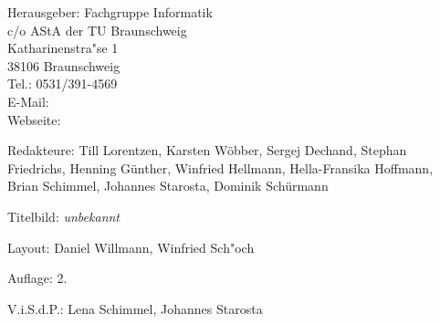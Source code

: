 
\begin{nimpressum}
\item[Herausgeber:]
	Fachgruppe Informatik\\
	c/o AStA der TU Braunschweig\\
	Katharinenstra"se 1\\
	38106 Braunschweig\\
	Tel.: 0531/391-4569\\
	E-Mail: \\
	Webseite: 
      \item[Redakteure:]
	Till Lorentzen,
	Karsten Wöbber, %
        Sergej Dechand,
        Stephan Friedrichs,
        Henning Günther,
        Winfried Hellmann,
        Hella-Fransika Hoffmann,
        Brian Schimmel,
        Johannes Starosta,
        Dominik Schürmann %
\item[Titelbild:]
	\textit{unbekannt}
\item[Layout:]
	Daniel Willmann, Winfried Sch"och

%
\item[Auflage:]
  2.
\item[V.i.S.d.P.:]  %
  Lena Schimmel, Johannes Starosta
\end{nimpressum}

